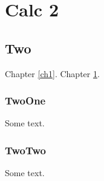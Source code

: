 \documentclass[openany]{book}
\begin{document}
\setcounter{part}{1}
\setcounter{chapter}{1}
\part{Calc 2}
\chapter{Two}\label{ch2}
Chapter \ref{ch1}.  Chapter \ref{ch2}.
\section{TwoOne}
Some text.
\section{TwoTwo}
Some text.
\end{document}
